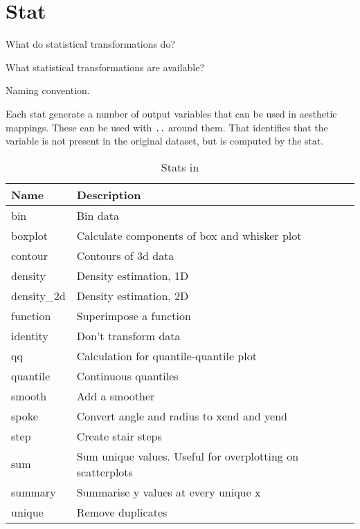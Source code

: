 \section{Stat}
\label{sec:stat}

What do statistical transformations do?

What statistical transformations are available?

Naming convention.

Each stat generate a number of output variables that can be used in aesthetic mappings.  These can be used with {\tt ..} around them.  That identifies that the variable is not present in the original dataset, but is computed by the stat.

\begin{table}
  \begin{center}
  \begin{tabular}{lp{3in}}
    \toprule
    Name & Description \\
    \midrule
    bin          & Bin data                                                   \\
    boxplot      & Calculate components of box and whisker plot               \\
    contour      & Contours of 3d data                                        \\
    density      & Density estimation, 1D                                     \\
    density\_2d & Density estimation, 2D                                     \\
    function     & Superimpose a function                                     \\
    identity     & Don't transform data                                       \\
    qq           & Calculation for quantile-quantile plot                     \\
    quantile     & Continuous quantiles                                       \\
    smooth       & Add a smoother                                             \\
    spoke        & Convert angle and radius to xend and yend                  \\
    step         & Create stair steps                                         \\
    sum          & Sum unique values.  Useful for overplotting on scatterplots\\
    summary      & Summarise y values at every unique x                       \\
    unique       & Remove duplicates                                          \\
    \bottomrule
  \end{tabular}
  \end{center}
  \caption{Stats in \ggplot}
  \label{tbl:stats}
\end{table}


